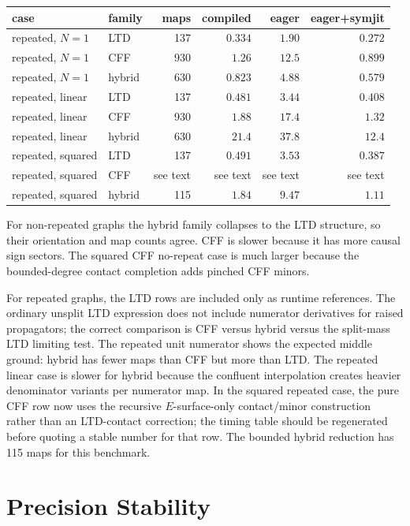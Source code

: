 \documentclass[11pt,a4paper]{report}
\begin{document}
\begin{center}
\begin{tabular}{llrrrr}
\toprule
case & family & maps & compiled & eager & eager+symjit \\
\midrule
repeated, \(N=1\) & LTD & 137 & \(0.334\) & \(1.90\) & \(0.272\) \\
repeated, \(N=1\) & CFF & 930 & \(1.26\) & \(12.5\) & \(0.899\) \\
repeated, \(N=1\) & hybrid & 630 & \(0.823\) & \(4.88\) & \(0.579\) \\
repeated, linear & LTD & 137 & \(0.481\) & \(3.44\) & \(0.408\) \\
repeated, linear & CFF & 930 & \(1.88\) & \(17.4\) & \(1.32\) \\
repeated, linear & hybrid & 630 & \(21.4\) & \(37.8\) & \(12.4\) \\
repeated, squared & LTD & 137 & \(0.491\) & \(3.53\) & \(0.387\) \\
repeated, squared & CFF & see text & see text & see text & see text \\
repeated, squared & hybrid & 115 & \(1.84\) & \(9.47\) & \(1.11\) \\
\bottomrule
\end{tabular}
\end{center}

For non-repeated graphs the hybrid family collapses to the LTD structure, so
their orientation and map counts agree.  CFF is slower because it has more
causal sign sectors.  The squared CFF no-repeat case is much larger because the
bounded-degree contact completion adds pinched CFF minors.

For repeated graphs, the LTD rows are included only as runtime references.  The
ordinary unsplit LTD expression does not include numerator derivatives for
raised propagators; the correct comparison is CFF versus hybrid versus the
split-mass LTD limiting test.  The repeated unit numerator shows the expected
middle ground: hybrid has fewer maps than CFF but more than LTD.  The repeated
linear case is slower for hybrid because the confluent interpolation creates
heavier denominator variants per numerator map.  In the squared repeated case,
the pure CFF row now uses the recursive \(E\)-surface-only contact/minor
construction rather than an LTD-contact correction; the timing table should be
regenerated before quoting a stable number for that row.  The bounded hybrid
reduction has 115 maps for this benchmark.

\section{Precision Stability}
\end{document}
